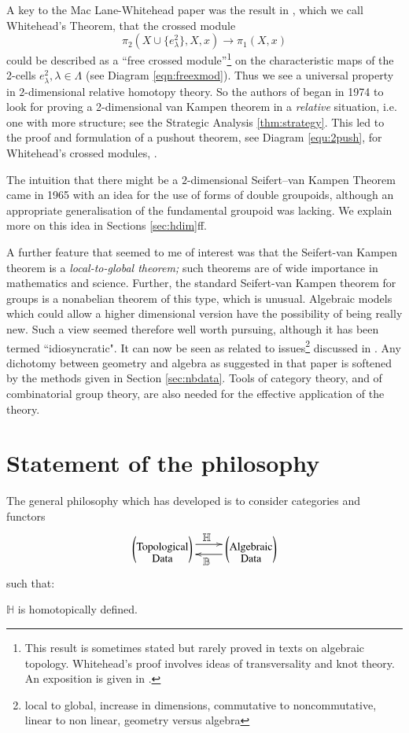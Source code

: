 \documentclass{elsarticle}
\def\B{\beta}
\def\B{\beta}
\def\H{\mathbb H}
\def\B{\mathbb B}
\def\xybiglabels{\def\labelstyle{\textstyle}}
\begin{document}
A key to the Mac Lane-Whitehead paper was the result in \cite[Section 16]{W49CHII}, which we call Whitehead's Theorem,   that the crossed module
$$\pi_2(X \cup \{e^2_\lambda \},X, x) \to \pi_1(X, x)$$
could be described as a ``free crossed module''\footnote{This result is sometimes stated but rarely proved in texts on algebraic topology. Whitehead's proof involves ideas of transversality and knot theory. An exposition is given in \cite{B80}. } on the characteristic maps of the 2-cells $e^2_\lambda, \lambda \in \Lambda$ (see Diagram \eqref{eqn:freexmod}). Thus we see a universal property in $2$-dimensional relative homotopy theory. So the authors of \cite{BH78sec} began in 1974 to look for proving a 2-dimensional van Kampen theorem in a {\it relative}  situation, i.e. one with more structure; see the Strategic Analysis \ref{thm:strategy}. This led to the proof and formulation of a pushout  theorem, see Diagram  \eqref{equ:2push},  for Whitehead's crossed modules, \cite{BH78sec}.


The intuition that there might be a $2$-dimensional Seifert--van Kampen Theorem came in 1965 with an idea for the use of forms of double groupoids, although an appropriate generalisation of the fundamental groupoid was lacking.  We explain more on this idea in Sections \ref{sec:hdim}ff.

A further feature that seemed to me  of interest was  that the Seifert-van Kampen theorem is a {\it local-to-global theorem;} such theorems are of wide importance in mathematics and science. Further, the standard Seifert-van Kampen theorem for groups is a nonabelian theorem of this type, which is unusual. Algebraic models which could allow a higher dimensional version have the possibility of being really new. Such a view seemed therefore well worth pursuing, although it has been termed ``idiosyncratic". It can now be seen as related to issues\footnote{local to global, increase in dimensions, commutative to noncommutative, linear to non linear, geometry versus algebra} discussed in  \cite{Atiyah}. Any dichotomy between geometry and algebra as suggested in that paper is softened by the methods given in Section \ref{sec:nbdata}. Tools of category theory, and of combinatorial group theory,  are also needed for the effective application of the theory.


\section{	Statement of the philosophy}\label{sec:phil}
The general philosophy which has developed is to consider categories and functors
$$  \xybiglabels \xymatrix{ \left(\txt{Topological\\ Data }\right) \ar@<1ex> [r]^{\H}  &\ar @<1ex> [l] ^{\B} \left(\txt{Algebraic \\ Data }\right)}$$
such that:
\begin{crit}

$\H$ is homotopically defined.  \label{crit1}
\end{crit}
\end{document}

